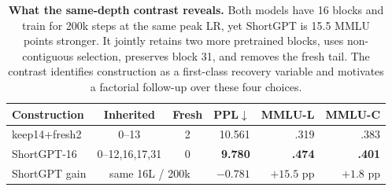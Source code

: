 \begin{table}[t]
\centering
\scriptsize
\setlength{\tabcolsep}{2.8pt}
\begin{tabular}{@{}lccrrr@{}}
\toprule
\textbf{Construction} & \textbf{Inherited} & \textbf{Fresh} &
\textbf{PPL}$\downarrow$ & \textbf{MMLU-L} & \textbf{MMLU-C} \\
\midrule
keep14+fresh2 & 0--13 & 2 & 10.561 & .319 & .383 \\
ShortGPT-16 & 0--12,16,17,31 & 0 & \textbf{9.780} & \textbf{.474} &
\textbf{.401} \\
\midrule
ShortGPT gain & \multicolumn{2}{c}{same 16L / 200k} & $-0.781$ &
$+15.5$ pp & $+1.8$ pp \\
\bottomrule
\end{tabular}
\caption{\textbf{What the same-depth contrast reveals.} Both models have 16
blocks and train for 200k steps at the same peak LR, yet ShortGPT is 15.5 MMLU
points stronger. It jointly retains two more pretrained blocks, uses
non-contiguous selection, preserves block 31, and removes the fresh tail. The
contrast identifies construction as a first-class recovery variable and
motivates a factorial follow-up over these four choices.}
\label{tab:construction-audit}
\end{table}
